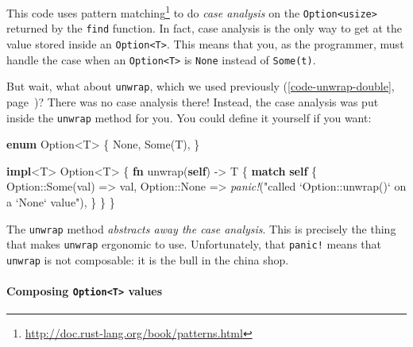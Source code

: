 \documentclass[a4paper,]{book}
\renewcommand*{\hypertarget}[3][\ar]{%
  \def\ar{#2}%
  \label{#1}%
  #3}
\renewcommand*{\hyperlink}[2]{%
 #2 (\autoref{#1}, page~\pageref{#1})}
\newenvironment{Shaded}{\begin{snugshade}}{\end{snugshade}}
\newcommand{\KeywordTok}[1]{\textcolor[rgb]{0.13,0.29,0.53}{\textbf{{#1}}}}
\newcommand{\DataTypeTok}[1]{\textcolor[rgb]{0.13,0.29,0.53}{{#1}}}
\newcommand{\ConstantTok}[1]{\textcolor[rgb]{0.00,0.00,0.00}{{#1}}}
\newcommand{\StringTok}[1]{\textcolor[rgb]{0.31,0.60,0.02}{{#1}}}
\newcommand{\PreprocessorTok}[1]{\textcolor[rgb]{0.56,0.35,0.01}{\textit{{#1}}}}
\newcommand{\NormalTok}[1]{{#1}}
\renewcommand{\href}[2]{#2\footnote{\url{#1}}}
\let\oldparagraph\paragraph
\renewcommand{\paragraph}[1]{\oldparagraph{#1}\mbox{}}
\begin{document}
This code uses
\href{http://doc.rust-lang.org/book/patterns.html}{pattern matching} to
do \emph{case analysis} on the
\texttt{Option\textless{}usize\textgreater{}} returned by the
\texttt{find} function. In fact, case analysis is the only way to get at
the value stored inside an \texttt{Option\textless{}T\textgreater{}}.
This means that you, as the programmer, must handle the case when an
\texttt{Option\textless{}T\textgreater{}} is \texttt{None} instead of
\texttt{Some(t)}.

But wait, what about \texttt{unwrap}, which we used
\protect\hyperlink{code-unwrap-double}{previously}? There was no case
analysis there! Instead, the case analysis was put inside the
\texttt{unwrap} method for you. You could define it yourself if you
want:

\protect\hypertarget{code-option-def-unwrap}{}{}

\begin{Shaded}
\begin{Highlighting}[]
\KeywordTok{enum} \DataTypeTok{Option}\NormalTok{<T> \{}
    \ConstantTok{None}\NormalTok{,}
    \ConstantTok{Some}\NormalTok{(T),}
\NormalTok{\}}

\KeywordTok{impl}\NormalTok{<T> }\DataTypeTok{Option}\NormalTok{<T> \{}
    \KeywordTok{fn} \NormalTok{unwrap(}\KeywordTok{self}\NormalTok{) -> T \{}
        \KeywordTok{match} \KeywordTok{self} \NormalTok{\{}
            \DataTypeTok{Option}\NormalTok{::}\ConstantTok{Some}\NormalTok{(val) => val,}
            \DataTypeTok{Option}\NormalTok{::}\ConstantTok{None} \NormalTok{=>}
              \PreprocessorTok{panic!}\NormalTok{(}\StringTok{"called `Option::unwrap()` on a `None` value"}\NormalTok{),}
        \NormalTok{\}}
    \NormalTok{\}}
\NormalTok{\}}
\end{Highlighting}
\end{Shaded}

The \texttt{unwrap} method \emph{abstracts away the case analysis}. This
is precisely the thing that makes \texttt{unwrap} ergonomic to use.
Unfortunately, that \texttt{panic!} means that \texttt{unwrap} is not
composable: it is the bull in the china shop.

\hypertarget{composing-optiont-values}{\paragraph{\texorpdfstring{Composing
\texttt{Option\textless{}T\textgreater{}}
values}{Composing Option\textless{}T\textgreater{} values}}\label{composing-optiont-values}}
\end{document}

